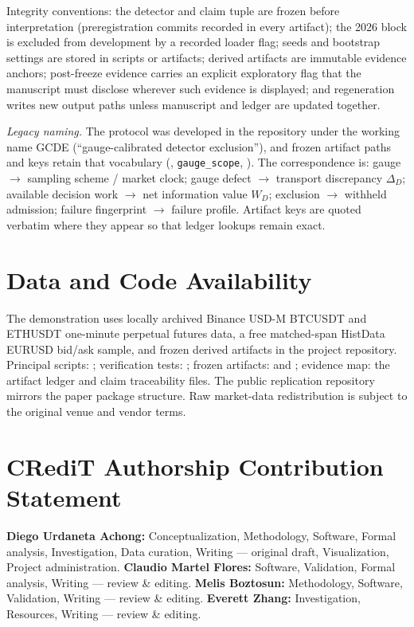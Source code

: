 \documentclass[3p]{elsarticle}
\begin{document}
Integrity conventions: the detector and claim tuple are frozen before
interpretation (preregistration commits recorded in every artifact); the 2026
block is excluded from development by a recorded loader flag; seeds and
bootstrap settings are stored in scripts or artifacts; derived artifacts are
immutable evidence anchors; post-freeze evidence carries an explicit
exploratory flag that the manuscript must disclose wherever such evidence is
displayed; and regeneration writes new output paths unless manuscript and
ledger are updated together.

\emph{Legacy naming.} The protocol was developed in the repository under the
working name GCDE (``gauge-calibrated detector exclusion''), and frozen
artifact paths and keys retain that vocabulary (,
\texttt{gauge\_scope}, ). The correspondence is:
gauge $\to$ sampling scheme / market clock; gauge defect $\to$ transport
discrepancy $\Delta_D$; available decision work $\to$ net information value
$W_D$; exclusion $\to$ withheld admission; failure fingerprint $\to$ failure
profile. Artifact keys are quoted verbatim where they appear so that ledger
lookups remain exact.

\section*{Data and Code Availability}

The demonstration uses locally archived Binance USD-M BTCUSDT and ETHUSDT
one-minute perpetual futures data, a free matched-span HistData EURUSD
bid/ask sample, and frozen derived artifacts in the project repository.
Principal scripts: ; verification tests:
; frozen artifacts:  and
; evidence map: the artifact ledger and claim
traceability files. The public replication repository mirrors the paper
package structure. Raw market-data redistribution is subject to the original
venue and vendor terms.

\section*{CRediT Authorship Contribution Statement}

\textbf{Diego Urdaneta Achong:} Conceptualization, Methodology, Software,
Formal analysis, Investigation, Data curation, Writing --- original draft,
Visualization, Project administration.
\textbf{Claudio Martel Flores:} Software, Validation, Formal analysis,
Writing --- review \& editing.
\textbf{Melis Boztosun:} Methodology, Software, Validation,
Writing --- review \& editing.
\textbf{Everett Zhang:} Investigation, Resources,
Writing --- review \& editing.
\end{document}
